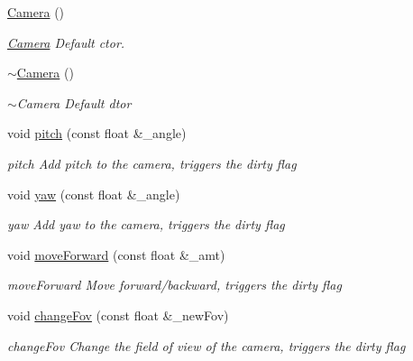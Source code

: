 \begin{DoxyCompactItemize}
\item 
\hypertarget{classCamera_a01f94c3543f56ede7af49dc778f19331}{\hyperlink{classCamera_a01f94c3543f56ede7af49dc778f19331}{Camera} ()}\label{classCamera_a01f94c3543f56ede7af49dc778f19331}

\begin{DoxyCompactList}\small\item\em \hyperlink{classCamera}{Camera} Default ctor. \end{DoxyCompactList}\item 
\hypertarget{classCamera_ad1897942d0ccf91052386388a497349f}{\hyperlink{classCamera_ad1897942d0ccf91052386388a497349f}{$\sim$\-Camera} ()}\label{classCamera_ad1897942d0ccf91052386388a497349f}

\begin{DoxyCompactList}\small\item\em $\sim$\-Camera Default dtor \end{DoxyCompactList}\item 
void \hyperlink{classCamera_a132f6e602fdcaabc5d361e6d9392bda2}{pitch} (const float \&\-\_\-angle)
\begin{DoxyCompactList}\small\item\em pitch Add pitch to the camera, triggers the dirty flag \end{DoxyCompactList}\item 
void \hyperlink{classCamera_ae6140b78de760fd0ef9a2c69d6d1018d}{yaw} (const float \&\-\_\-angle)
\begin{DoxyCompactList}\small\item\em yaw Add yaw to the camera, triggers the dirty flag \end{DoxyCompactList}\item 
void \hyperlink{classCamera_af7e91ff00e0259e2917c09d850c50364}{move\-Forward} (const float \&\-\_\-amt)
\begin{DoxyCompactList}\small\item\em move\-Forward Move forward/backward, triggers the dirty flag \end{DoxyCompactList}\item 
void \hyperlink{classCamera_a8d323c4dd7346ff6a46a611108e22e1f}{change\-Fov} (const float \&\-\_\-new\-Fov)
\begin{DoxyCompactList}\small\item\em change\-Fov Change the field of view of the camera, triggers the dirty flag \end{DoxyCompactList}\item 

\end{DoxyCompactItemize}
